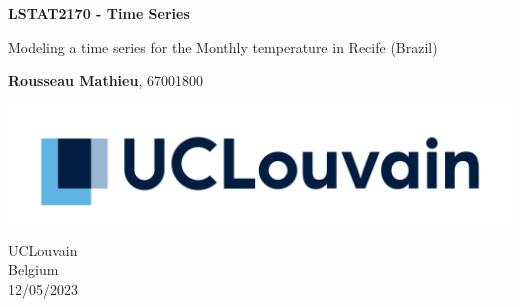 \begin{titlepage}
	\begin{center}
	  \vspace*{1cm}
		  
	  \Huge
	  \textbf{LSTAT2170 - Time Series}
		  
	  \vspace{0.5cm}
	  \LARGE
	  Modeling a time series for the Monthly temperature in Recife (Brazil)
		  
	  \vspace{2.5cm}
	  
	  \Large
	  \textbf{Rousseau Mathieu}, 67001800
		  
	  \vfill
		  
	  \vspace{0.8cm}
		  
	  \includegraphics[width=\textwidth]{figures/logo_ucl.png}
  
	  \vspace{0.8cm}
		  
	  \Large
	  UCLouvain \\
	  Belgium \\
	  12/05/2023
	\end{center}
  \end{titlepage}